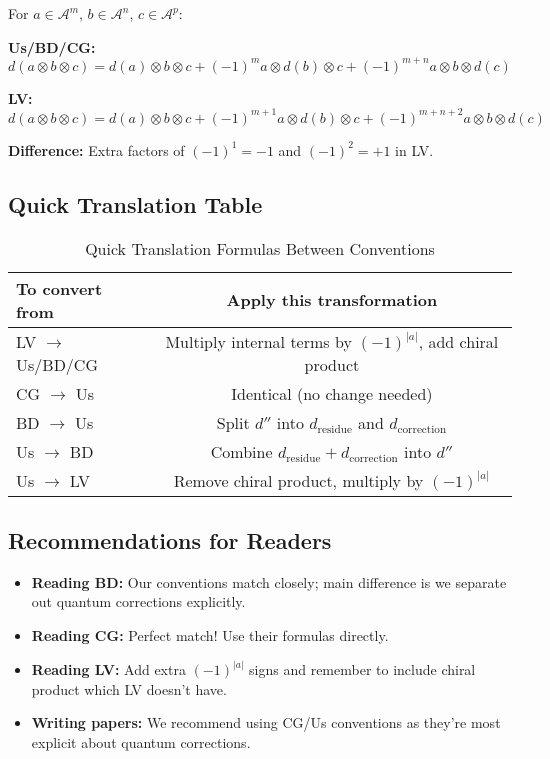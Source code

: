 \begin{example}
For $a \in \mathcal{A}^m$, $b \in \mathcal{A}^n$, $c \in \mathcal{A}^p$:

\textbf{Us/BD/CG:}
$$d(a \otimes b \otimes c) = d(a) \otimes b \otimes c + (-1)^m a \otimes d(b) \otimes c 
+ (-1)^{m+n} a \otimes b \otimes d(c)$$

\textbf{LV:}
$$d(a \otimes b \otimes c) = d(a) \otimes b \otimes c + (-1)^{m+1} a \otimes d(b) \otimes c 
+ (-1)^{m+n+2} a \otimes b \otimes d(c)$$

\textbf{Difference:} Extra factors of $(-1)^1 = -1$ and $(-1)^2 = +1$ in LV.
\end{example}

\subsection{Quick Translation Table}

\begin{table}[H]
\centering
\caption{Quick Translation Formulas Between Conventions}
\begin{tabular}{|l|c|}
\hline
\textbf{To convert from} & \textbf{Apply this transformation} \\
\hline
\hline
LV $\to$ Us/BD/CG & Multiply internal terms by $(-1)^{|a|}$, add chiral product \\
\hline
CG $\to$ Us & Identical (no change needed) \\
\hline
BD $\to$ Us & Split $d''$ into $d_{\text{residue}}$ and $d_{\text{correction}}$ \\
\hline
Us $\to$ BD & Combine $d_{\text{residue}} + d_{\text{correction}}$ into $d''$ \\
\hline
Us $\to$ LV & Remove chiral product, multiply by $(-1)^{|a|}$ \\
\hline
\end{tabular}
\end{table}

\subsection{Recommendations for Readers}

\begin{itemize}
\item \textbf{Reading BD:} Our conventions match closely; main difference is we separate out 
quantum corrections explicitly.
\item \textbf{Reading CG:} Perfect match! Use their formulas directly.
\item \textbf{Reading LV:} Add extra $(-1)^{|a|}$ signs and remember to include chiral product 
which LV doesn't have.
\item \textbf{Writing papers:} We recommend using CG/Us conventions as they're most explicit 
about quantum corrections.
\end{itemize}

